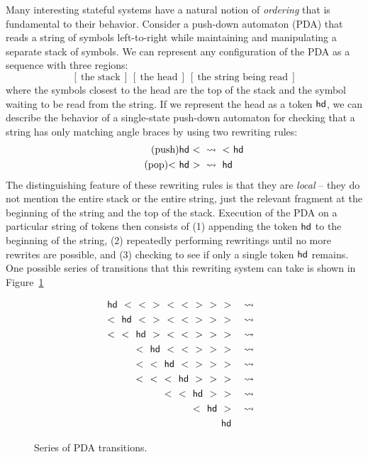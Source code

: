 Many interesting stateful systems have a natural notion of {\it
  ordering} that is fundamental to their behavior. Consider a
push-down automaton (PDA) that reads a string of symbols left-to-right
while maintaining and manipulating a separate stack of symbols. We can
represent any configuration of the PDA as a sequence 
with three regions:
\[
[~\mbox{the stack}~]
~
[~\mbox{the head}~]
~
[~\mbox{the string being read}~]
\]
where the symbols closest to the head are the top of the stack and the
symbol waiting to be read from the string. If we represent the head as
a token ${\sf hd}$, we can describe the behavior of a single-state
push-down automaton for checking that a string has only matching 
angle braces by using two rewriting rules:
\begin{align}
\tag{push} {\sf hd}~{<} ~&\rightsquigarrow~ {<}~{\sf hd}
\\
\tag{pop} {<}~{\sf hd}~{>} ~&\rightsquigarrow~ {\sf hd}
\end{align}
The distinguishing feature of these rewriting rules is that they are
{\it local} -- they do not mention the entire stack or the entire
string, just the relevant fragment at the beginning of the string and
the top of the stack. Execution of the PDA on a particular string of
tokens then consists of (1) appending the token ${\sf hd}$ to the
beginning of the string, (2) repeatedly performing rewritings until no
more rewrites are possible, and (3) checking to see if only a single
token ${\sf hd}$ remains. One possible series of transitions that this
rewriting system can take is shown in Figure~\ref{fig:pda-transitions}

\begin{figure}
\begin{align*}
{\sf hd}~~{<}~~{<}~~{>}~~{<}~~{<}~~{>}~~{>}~~{>}
& ~~~\rightsquigarrow~~\\
{<}~~{\sf hd}~~{<}~~{>}~~{<}~~{<}~~{>}~~{>}~~{>}
& ~~~\rightsquigarrow~~\\
{<}~~{<}~~{\sf hd}~~{>}~~{<}~~{<}~~{>}~~{>}~~{>}
& ~~~\rightsquigarrow~~\\
{<}~~{\sf hd}~~{<}~~{<}~~{>}~~{>}~~{>}
& ~~~\rightsquigarrow~~\\
{<}~~{<}~~{\sf hd}~~{<}~~{>}~~{>}~~{>}
& ~~~\rightsquigarrow~~\\
{<}~~{<}~~{<}~~{\sf hd}~~{>}~~{>}~~{>}
& ~~~\rightsquigarrow~~\\
{<}~~{<}~~{\sf hd}~~{>}~~{>}
& ~~~\rightsquigarrow~~\\
{<}~~{\sf hd}~~{>}
& ~~~\rightsquigarrow~~\\
{\sf hd} &
\end{align*}
\caption{Series of PDA transitions.}
\label{fig:pda-transitions}
\end{figure}

